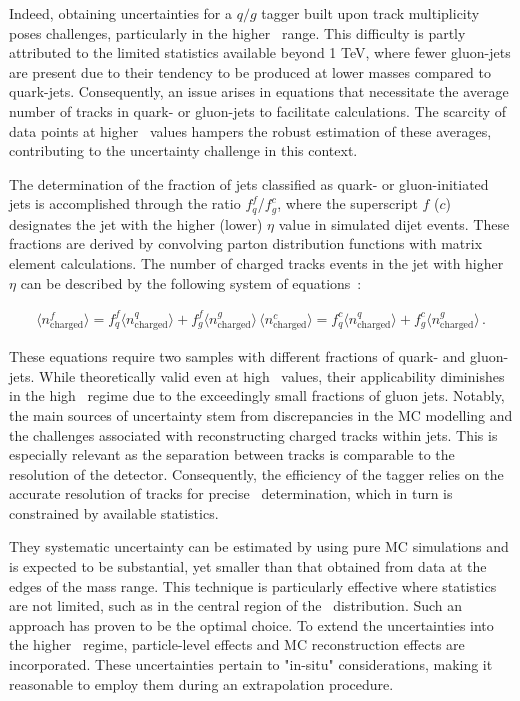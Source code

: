 Indeed, obtaining uncertainties for a $q/g$ tagger built upon track multiplicity poses challenges, particularly in the higher \pt\ range. This difficulty is partly attributed to the limited statistics available beyond 1 TeV, where fewer gluon-jets are present due to their tendency to be produced at lower masses compared to quark-jets. Consequently, an issue arises in equations that necessitate the average number of tracks in quark- or gluon-jets to facilitate calculations. The scarcity of data points at higher \pt\ values hampers the robust estimation of these averages, contributing to the uncertainty challenge in this context.

The determination of the fraction of jets classified as quark- or gluon-initiated jets is accomplished through the ratio $f^f_q$/$f^c_g$, where the superscript $f$ ($c$) designates the jet with the higher (lower) $\eta$ value in simulated dijet events. These fractions are derived by convolving parton distribution functions with matrix element calculations. The number of charged tracks events in the jet with higher $\eta$ can be described by the following system of equations~\cite{ATL-PHYS-PUB-2017-009}:

\begin{eqnarray}
\langle n^f_{\mathrm{charged}} \rangle = f^f_q \langle n^q_{\mathrm{charged}}\rangle + f^f_g\langle n^g_{\mathrm{charged}}\rangle\, 
\langle n^c_{\mathrm{charged}} \rangle = f^c_q \langle n^q_{\mathrm{charged}}\rangle + f^c_g\langle n^g_{\mathrm{charged}}\rangle\, .
\end{eqnarray}

These equations require two samples with different fractions of quark- and gluon-jets. While theoretically valid even at high \pt\ values, their applicability diminishes in the high \pt\ regime due to the exceedingly small fractions of gluon jets. Notably, the main sources of uncertainty stem from discrepancies in the MC modelling and the challenges associated with reconstructing charged tracks within jets. This is especially relevant as the separation between tracks is comparable to the resolution of the detector. Consequently, the efficiency of the tagger relies on the accurate resolution of tracks for precise \ntrk\ determination, which in turn is constrained by available statistics.

They systematic uncertainty can be estimated by using pure MC simulations and is expected to be substantial, yet smaller than that obtained from data at the edges of the mass range. This technique is particularly effective where statistics are not limited, such as in the central region of the \pt\ distribution. Such an approach has proven to be the optimal choice. To extend the uncertainties into the higher \pt\ regime, particle-level effects and MC reconstruction effects are incorporated. These uncertainties pertain to "in-situ" considerations, making it reasonable to employ them during an extrapolation procedure.

